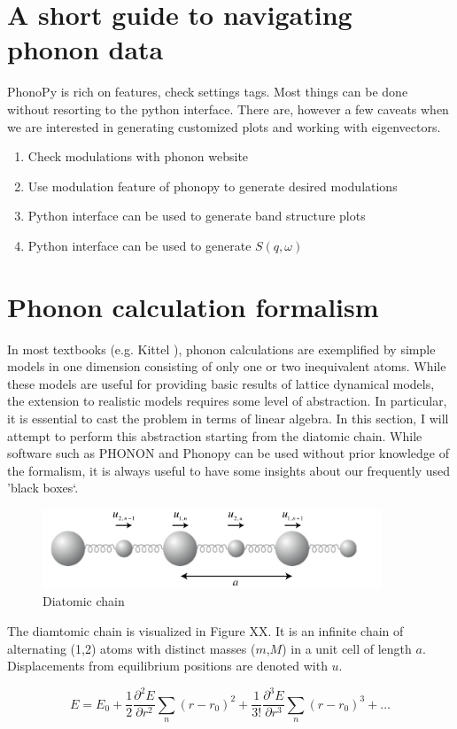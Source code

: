 \chapter{A short guide to navigating phonon data}

PhonoPy is rich on features, check settings tags. Most things can be done without resorting to the python interface. There are, however a few caveats when we are interested in generating customized plots and working with eigenvectors.

\begin{enumerate}
    \item Check modulations with phonon website
    \item Use modulation feature of phonopy to generate desired modulations
    \item Python interface can be used to generate band structure plots
    \item Python interface can be used to generate $S(q,\omega)$
\end{enumerate}

\chapter{Phonon calculation formalism}
In most textbooks (e.g. Kittel \cite{Kittel2005}), phonon calculations are exemplified by simple models in one dimension consisting of only one or two inequivalent atoms. While these models are useful for providing basic results of lattice dynamical models, the extension to realistic models requires some level of abstraction. In particular, it is essential to cast the problem in terms of linear algebra. In this section, I will attempt to perform this abstraction starting from the diatomic chain. While software such as PHONON \cite{Parlinski1997} and Phonopy \cite{Togo2015} can be used without prior knowledge of the formalism, it is always useful to have some insights about our frequently used 'black boxes`.

\begin{figure}
    \centering
    \includegraphics[width=0.9\textwidth]{fig/temp/diatomic.png}
    \caption{Diatomic chain}
    \label{fig:diatomic}
\end{figure}

The diamtomic chain is visualized in Figure XX. It is an infinite chain of alternating (1,2) atoms with distinct masses ($m$,$M$) in a unit cell of length $a$. Displacements from equilibrium positions are denoted with $u$.



\[ E = E_0 + \frac{1}{2} \frac{\partial^2 E}{\partial r^2} \sum_n (r - r_0)^2 + \frac{1}{3!} \frac{\partial^3 E}{\partial r^3} \sum_n (r - r_0)^3 + \dots \]





